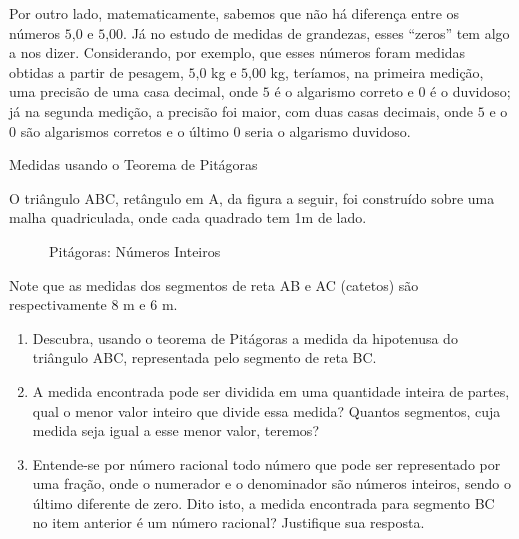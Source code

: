 Por outro lado, matematicamente, sabemos que não há diferença entre os números $5\text{,}0$ e $5\text{,}00$. Já no estudo de medidas de grandezas, esses “zeros” tem algo a nos dizer. Considerando, por exemplo, que esses números foram medidas obtidas a partir de pesagem, $5\text{,}0$ kg  e $5\text{,}00$ kg, teríamos, na primeira medição, uma precisão de uma casa decimal, onde $5$ é o algarismo correto e $0$ é o duvidoso; já na segunda medição, a precisão foi maior, com duas casas decimais, onde $5$ e o $0$ são algarismos corretos e o último $0$ seria o algarismo duvidoso.
\begin{task}{Medidas usando o Teorema de Pitágoras}
\label{sub-ativ-pitagoras}



O triângulo ABC, retângulo em A, da figura a seguir, foi construído sobre uma malha quadriculada, onde cada quadrado tem 1m de lado.

\begin{figure}[H]
\centering
\capstart

\caption{Pitágoras: Números Inteiros}\label{\detokenize{NO103-5:id6}}\label{\detokenize{NO103-5:id16}}\end{figure}

Note que as medidas dos segmentos de reta AB e AC (catetos) são respectivamente $8$ m e $6$ m.
\begin{enumerate}
\item {} 
Descubra, usando o teorema de Pitágoras a medida da hipotenusa do triângulo ABC, representada pelo segmento de reta BC.

\item {} 
A medida encontrada pode ser dividida em uma quantidade inteira de partes, qual o menor valor inteiro que divide essa medida? Quantos segmentos, cuja medida seja igual a esse menor valor, teremos?

\item {} 
Entende-se por número racional todo número que pode ser representado por uma fração, onde o numerador e o denominador são números inteiros, sendo o último diferente de zero. Dito isto, a medida encontrada para segmento BC no item anterior é um número racional? Justifique sua resposta.


\end{enumerate}
\end{task}
